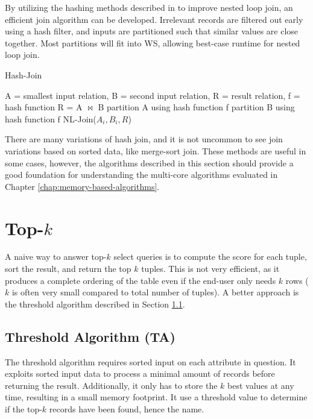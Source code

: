 By utilizing the hashing methods described in \cite{relhash} to
improve nested loop join, an efficient join algorithm can be
developed. Irrelevant records are filtered out early using a hash
filter, and inputs are partitioned such that similar values are close
together. Most partitions will fit into WS, allowing best-case
runtime for nested loop join.

\begin{algorithm}[H]
	\caption{Hash-Join}
	\begin{algorithmic}
		\REQUIRE A = smallest input relation, B = second input
		relation, R = result relation, f = hash function
		\ENSURE R = A $\bowtie$ B
		\STATE partition A using hash function f
		\STATE partition B using hash function f
			\STATE NL-Join($A_i,B_i,R$)
		\ENDFOR
	\end{algorithmic}
\end{algorithm}

There are many variations of hash join, and it is not uncommon to see
join variations based on sorted data, like merge-sort join. These
methods are useful in some cases, however, the algorithms described in
this section should provide a good foundation for understanding the
multi-core algorithms evaluated in Chapter
\ref{chap:memory-based-algorithms}.

\section{Top-$k$}

A naive way to answer top-$k$ select queries is to compute the score for
each tuple, sort the result, and return the top $k$ tuples. This is not
very efficient, as it produces a complete ordering of the table even
if the end-user only needs $k$ rows ($k$ is often very small compared to
total number of tuples). A better approach is the threshold algorithm
described in Section \ref{sec:ta}.

\subsection{Threshold Algorithm (TA)}
\label{sec:ta}

The threshold algorithm requires sorted input on each attribute in
question. It exploits sorted input data to process a minimal amount of
records before returning the result. Additionally, it only has to
store the $k$ best values at any time, resulting in a small memory
footprint. It use a threshold value to determine if the top-$k$ records
have been found, hence the name.

